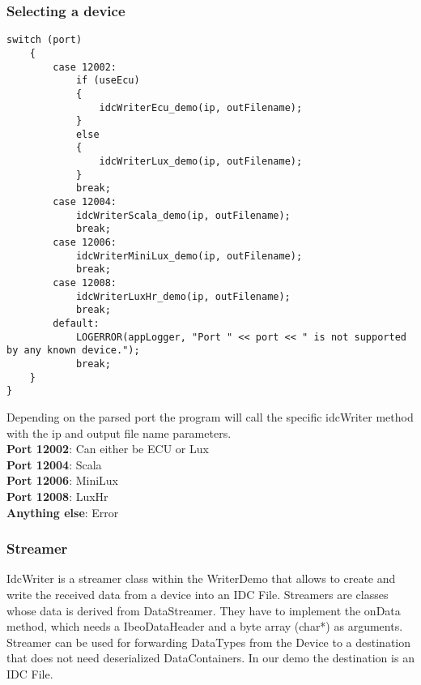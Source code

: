\subsubsection{Selecting a device}
\begin{lstlisting}[firstnumber=last]
	switch (port)
	{
		case 12002:
			if (useEcu)
			{
				idcWriterEcu_demo(ip, outFilename);
			}
			else
			{
				idcWriterLux_demo(ip, outFilename);
			}
			break;
		case 12004:
			idcWriterScala_demo(ip, outFilename);
			break;
		case 12006:
			idcWriterMiniLux_demo(ip, outFilename);
			break;
		case 12008:
			idcWriterLuxHr_demo(ip, outFilename);
			break;
		default:
			LOGERROR(appLogger, "Port " << port << " is not supported by any known device.");
			break;
	}
}
\end{lstlisting}
Depending on the parsed port the program will call the specific idcWriter method with the ip and output file name parameters. \\
\textbf{Port 12002}: Can either be ECU or Lux\\
\textbf{Port 12004}: Scala\\
\textbf{Port 12006}: MiniLux\\
\textbf{Port 12008}: LuxHr\\
\textbf{Anything else}: Error
\newpage
\subsubsection{Streamer}
IdcWriter is a streamer class within the WriterDemo that allows to create and write the received data from a device into an IDC File. Streamers are classes whose data is derived from DataStreamer. They have to implement the onData method, which needs a IbeoDataHeader and a byte array (char*) as arguments. \\
Streamer can be used for forwarding DataTypes from the Device to a destination that does not need deserialized DataContainers. In our demo the destination is an IDC File.
